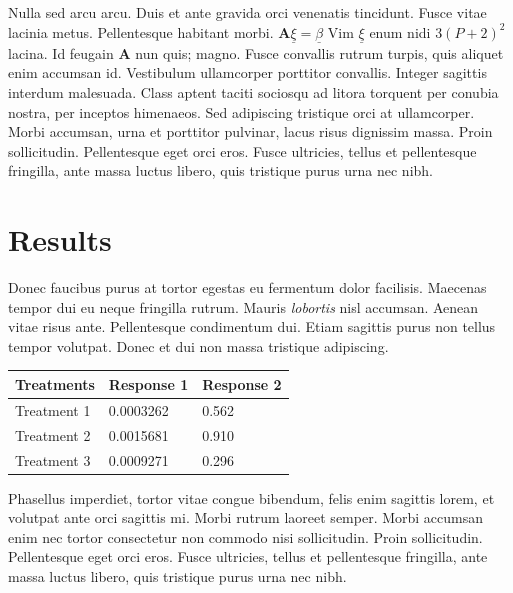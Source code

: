 \documentclass[a0,landscape]{a0poster}
\begin{document}
\begin{multicols}{4}
Nulla sed arcu arcu. Duis et ante gravida orci venenatis tincidunt. Fusce vitae lacinia metus. Pellentesque habitant morbi. $\mathbf{A}\underline{\xi}=\underline{\beta}$ Vim $\underline{\xi}$ enum nidi $3(P+2)^{2}$ lacina. Id feugain $\mathbf{A}$ nun quis; magno. Fusce convallis rutrum turpis, quis aliquet enim accumsan id. Vestibulum ullamcorper porttitor convallis. Integer sagittis interdum malesuada. Class aptent taciti sociosqu ad litora torquent per conubia nostra, per inceptos himenaeos. Sed adipiscing tristique orci at ullamcorper. Morbi accumsan, urna et porttitor pulvinar, lacus risus dignissim massa. Proin sollicitudin. Pellentesque eget orci eros. Fusce ultricies, tellus et pellentesque fringilla, ante massa luctus libero, quis tristique purus urna nec nibh.


\section*{Results}

Donec faucibus purus at tortor egestas eu fermentum dolor facilisis. Maecenas tempor dui eu neque fringilla rutrum. Mauris \emph{lobortis} nisl accumsan. Aenean vitae risus ante. Pellentesque condimentum dui. Etiam sagittis purus non tellus tempor volutpat. Donec et dui non massa tristique adipiscing.
%
\begin{table} %
\begin{tabular}{l l l}
\toprule
\textbf{Treatments} & \textbf{Response 1} & \textbf{Response 2}\\
\midrule
Treatment 1 & 0.0003262 & 0.562 \\
Treatment 2 & 0.0015681 & 0.910 \\
Treatment 3 & 0.0009271 & 0.296 \\
\bottomrule
\end{tabular}
\end{table}
%
Phasellus imperdiet, tortor vitae congue bibendum, felis enim sagittis lorem, et volutpat ante orci sagittis mi. Morbi rutrum laoreet semper. Morbi accumsan enim nec tortor consectetur non commodo nisi sollicitudin. Proin sollicitudin. Pellentesque eget orci eros. Fusce ultricies, tellus et pellentesque fringilla, ante massa luctus libero, quis tristique purus urna nec nibh.


\end{multicols}
\end{document}
